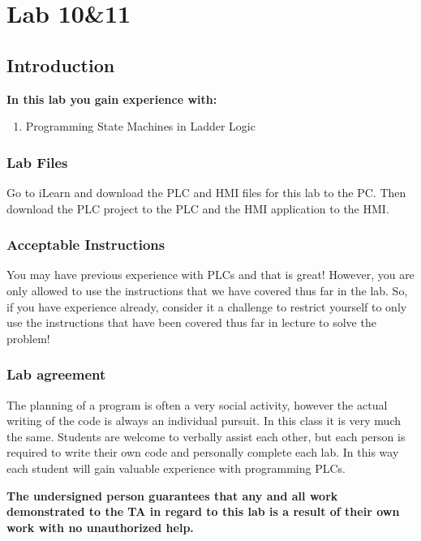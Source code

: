 \chapter{Lab 10\&11}
\setcounter{TASignatures}{0}
\setcounter{AsideCounter}{0}

\section{Introduction}
    \vspace{0.1em}

    \textbf{In this lab you gain experience with:}
    \begin{enumerate}
        \item Programming State Machines in Ladder Logic
    \end{enumerate}

\subsection{Lab Files}

Go to iLearn and download the PLC and HMI files for this lab to the PC. Then download the PLC project to the PLC and the HMI application to the HMI. 

\subsection{Acceptable Instructions}

You may have previous experience with PLCs and that is great! However, you are only allowed to use the instructions that we have covered thus far in the lab. So, if you have experience already, consider it a challenge to restrict yourself to only use the instructions that have been covered thus far in lecture to solve the problem!

\subsection{Lab agreement}

The planning of a program is often a very social activity, however the actual writing of the code is always an individual pursuit. In this class it is very much the same. Students are welcome to verbally assist each other, but each person is required to write their own code and personally complete each lab. In this way each student will gain valuable experience with programming PLCs. 

\textbf{The undersigned person guarantees that any and all work demonstrated to the TA in regard to this lab is a result of their own work with no unauthorized help.}

